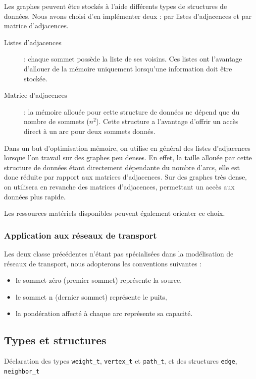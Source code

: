 \FloatBarrier

Les graphes peuvent être stockés à l'aide différents types de structures de données. Nous avons choisi d'en implémenter deux :  par listes d'adjacences et par matrice d'adjacences.
\begin{description}
\item[Listes d'adjacences] : chaque sommet possède la liste de ses voisins. Ces listes ont l'avantage d'allouer de la mémoire uniquement lorsqu'une information doit être stockée. 
\item[Matrice d'adjacences] : la mémoire allouée pour cette structure de données ne dépend que du nombre de sommets ($n^2$). Cette structure a l'avantage d'offrir un accès direct à un arc pour deux sommets donnés.
\end{description}

Dans un but d'optimisation mémoire, on utilise en général des listes d'adjacences lorsque l'on travail sur des graphes peu denses. En effet, la taille allouée par cette structure de données étant directement dépendante du nombre d'arcs, elle est donc réduite par rapport aux matrices d'adjacences. Sur des graphes très dense, on utilisera en revanche des matrices d'adjacences, permettant un accès aux données plus rapide. 

Les ressources matériels disponibles peuvent également orienter ce choix.

\subsubsection{Application aux réseaux de transport}
Les deux classe précédentes n'étant pas spécialisées dans la modélisation de réseaux de transport, nous adopterons les conventions suivantes :
\begin{itemize}
\item le sommet zéro (premier sommet) représente la source,
\item le sommet n (dernier sommet) représente le puits,
\item la pondération affecté à chaque arc représente sa capacité.
\end{itemize}

\subsection{Types et structures}

Déclaration des types \texttt{weight\_t}, \texttt{vertex\_t} et \texttt{path\_t}, et des structures \texttt{edge}, \texttt{neighbor\_t}

